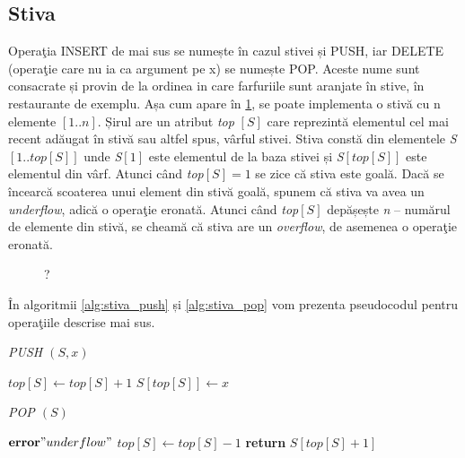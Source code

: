 \subsection{Stiva}

Operaţia INSERT de mai sus se numește în cazul stivei și PUSH, iar DELETE (operaţie care nu ia ca argument pe x) se numește POP. Aceste nume sunt consacrate și provin de la ordinea in care farfuriile sunt aranjate în stive, în restaurante de exemplu.
Așa cum apare în \ref{fig:structuriDate1}, se poate implementa o stivă cu n elemente $\left [ 1..n \right ]$. Șirul are un atribut \textit{top} $\left [ S \right ] $ care reprezintă elementul cel mai recent adăugat în stivă sau altfel spus, vârful stivei.
Stiva constă din elementele \textit{S}$\left [ 1..\textit{top} \left [ S \right ] \right ]$ unde \textit{S}$\left [ 1 \right ]$ este elementul de la baza stivei și \textit{S}$\left [ \textit{top}\left [ S \right ] \right ]$ este elementul din vârf.
Atunci când \textit{top}$\left [ S \right ] = 1$ se zice că stiva este goală. Dacă se încearcă scoaterea unui element din stivă goală, spunem că stiva va avea un \textit{underflow}, adică o operaţie eronată.
Atunci când \textit{top}$\left [ S \right ]$ depășește \textit{n} – numărul de elemente din stivă, se cheamă că stiva are un \textit{overflow}, de asemenea o operaţie eronată.

\begin{figure}[ht] %
	\centering	
		\caption{?} 
		\label{fig:structuriDate1}
	\end{figure}


În algoritmii \ref{alg:stiva_push} și \ref{alg:stiva_pop} vom prezenta pseudocodul pentru operaţiile descrise mai sus.

\begin{algorithm} [H]
	\caption{\textit{PUSH $\left ( S, x \right )$}}\label{alg:stiva_push}
	\begin{algorithmic}[1]
		\State $top[S]\gets top[S] + 1$
		\State $S[top[S]]\gets x$
	\end{algorithmic}
\end{algorithm}


\begin{algorithm} [H]
	\caption{\textit{POP $\left ( S \right )$}}\label{alg:stiva_pop}
	\begin{algorithmic}[1]
		\State 	$\textbf{error} "underflow"$	
		\Else 
		\State $top[S]\gets top[S] - 1$
		\EndIf	
		\State \textbf{return} ${S[top[S] + 1]}$	
	\end{algorithmic}
\end{algorithm}

